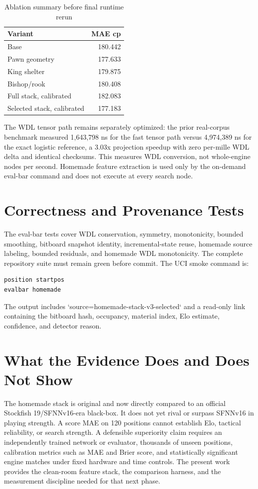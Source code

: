 \documentclass[10pt,conference]{IEEEtran}
\begin{document}
\begin{table}[t]
\centering
\caption{Ablation summary before final runtime rerun}
\label{tab:ablation}
\begin{tabular}{lr}
\toprule
Variant & MAE cp\\
\midrule
Base & 180.442\\
Pawn geometry & 177.633\\
King shelter & 179.875\\
Bishop/rook & 180.408\\
Full stack, calibrated & 182.083\\
Selected stack, calibrated & 177.183\\
\bottomrule
\end{tabular}
\end{table}

The WDL tensor path remains separately optimized: the prior real-corpus benchmark measured 1,643,798 ns for the fast tensor path versus 4,974,389 ns for the exact logistic reference, a 3.03x projection speedup with zero per-mille WDL delta and identical checksums. This measures WDL conversion, not whole-engine nodes per second. Homemade feature extraction is used only by the on-demand eval-bar command and does not execute at every search node.

\section{Correctness and Provenance Tests}
The eval-bar tests cover WDL conservation, symmetry, monotonicity, bounded smoothing, bitboard snapshot identity, incremental-state reuse, homemade source labeling, bounded residuals, and homemade WDL monotonicity. The complete repository suite must remain green before commit. The UCI smoke command is:
\begin{verbatim}
position startpos
evalbar homemade
\end{verbatim}
The output includes `source=homemade-stack-v3-selected` and a read-only link containing the bitboard hash, occupancy, material index, Elo estimate, confidence, and detector reason.

\section{What the Evidence Does and Does Not Show}
The homemade stack is original and now directly compared to an official Stockfish 19/SFNNv16-era black-box. It does not yet rival or surpass SFNNv16 in playing strength. A score MAE on 120 positions cannot establish Elo, tactical reliability, or search strength. A defensible superiority claim requires an independently trained network or evaluator, thousands of unseen positions, calibration metrics such as MAE and Brier score, and statistically significant engine matches under fixed hardware and time controls. The present work provides the clean-room feature stack, the comparison harness, and the measurement discipline needed for that next phase.
\end{document}
